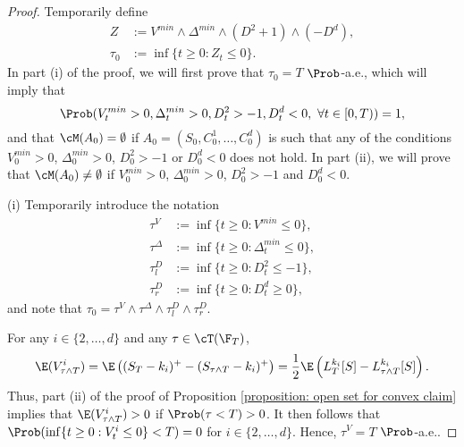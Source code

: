 \documentclass[11pt]{article}
\begin{document}
\begin{proof}

Temporarily define
\begin{align*}
Z &:= V^{min} \wedge \Delta^{min} \wedge (D^2 + 1) \wedge (-D^d), \\
%
%
%
\tau_0 &:= \inf\{ t \geq 0: Z_t \leq 0 \}.
\end{align*}
In part (i) of the proof, we will first prove that $\tau_0 = T$ $\Prob$-a.e., which will imply that
$$
\Prob(V^{min}_t > 0, \Delta^{min}_t > 0, D^2_t > -1, D^d_t < 0, \ \forall t \in [0,T) ) = 1,
$$
and that $\cM(A_0) = \emptyset$ if $A_0 = (S_0, C^1_0, \ldots, C^d_0)$ is such that any of the conditions $V^{min}_0 > 0$, $\Delta^{min}_0 > 0$, $D^2_0 > -1$ or $D^d_0 < 0$ does not hold. In part (ii), we will prove that $\cM(A_0) \neq \emptyset$ if $V^{min}_0 > 0$, $\Delta^{min}_0 > 0$, $D^2_0 > -1$ and $D^d_0 < 0$. \\

\item (i) Temporarily introduce the notation
\begin{align*}
\tau^V &:= \inf\{ t \geq 0: V^{min} \leq 0 \}, \\
%
%
%
\tau^\Delta &:= \inf\{ t \geq 0: \Delta^{min}_t \leq 0 \}, \\
%
%
%
\tau^D_l &:= \inf\{ t \geq 0: D^2_t \leq -1 \}, \\
%
%
%
\tau^D_r &:= \inf\{ t \geq 0: D^d_t \geq 0 \},
\end{align*}
and note that $\tau_0 = \tau^V \wedge \tau^\Delta \wedge \tau^D_l \wedge \tau^D_r$.

For any $i \in \{2,\ldots,d\}$ and any $\tau \in \cT(\F_T)$,
\begin{align*}
\E( V^i_{\tau \wedge T} ) = \E \left( (S_T - k_i)^+ - (S_{\tau \wedge T} - k_i)^+ \right) = \frac{1}{2} \E \left( L^{k_i}_T[S] - L^{k_i}_{\tau \wedge T}[S]  \right).
\end{align*}
Thus, part (ii) of the proof of Proposition \ref{proposition: open set for convex claim} implies that $\E( V^i_{\tau \wedge T} ) > 0$ if $\Prob(\tau < T) > 0$. It then follows that $\Prob( \inf\{ t \geq 0: V^i_t \leq 0 \} < T) = 0$ for $i \in \{2,\ldots,d\}$. Hence, $\tau^V = T$ $\Prob$-a.e.. 


\end{proof}
\end{document}
